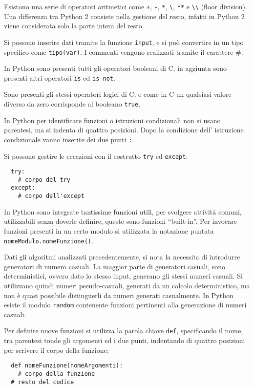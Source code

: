\documentclass{article}
\numberwithin{equation}{subsection}
\begin{document}
Esistono una serie di operatori aritmetici come \verb|+|, \verb|-|, \verb|*|, \verb|\|, \verb|**| e \verb|\\| (floor division). Una differenza tra Python 2 consiste nella gestione del resto, infatti in Python 2 
viene considerata solo la parte intera del resto. 

Si possono inserire dati tramite la funzione \verb|input|, e si può convertire in un tipo specifico come \verb|tipo(var)|. I commenti vengono 
realizzati tramite il carattere \#. 

In Python sono presenti tutti gli operatori booleani di C, in aggiunta sono presenti altri operatori \verb|is| ed \verb|is not|. 


Sono presenti gli stessi operatori logici di C, e come in C un qualsiasi valore diverso da zero corrisponde al booleano \verb|true|. 

In Python per identificare funzioni o istruzioni condizionali non si usano parentesi, ma si indenta di quattro posizioni. Dopo la condizione dell'
istruzione condizionale vanno inserite dei due punti \verb|:|. 


Si possono gestire le eccezioni con il costrutto \verb|try| ed \verb|except|:
\begin{verbatim}
  try:
    # corpo del try
  except:
    # corpo dell'except
\end{verbatim}

In Python sono integrate tantissime funzioni utili, per svolgere attività comuni, utilizzabili senza doverle definire, queste sono funzioni ``built-in''. 
Per invocare funzioni presenti in un certo modulo si utilizzata la notazione puntata \verb|nomeModulo.nomeFunzione()|. 


Dati gli algoritmi analizzati precedentemente, si nota la necessita di introdurre generatori di numero casuali. La maggior parte di generatori casuali, sono deterministici, 
ovvero dato lo stesso input, generano gli stessi numeri casuali. Si utilizzano quindi numeri pseudo-casuali, generati da un calcolo deterministico, ma non è quasi possibile 
distinguerli da numeri generati casualmente. In Python esiste il modulo \verb|random| contenente funzioni pertinenti alla generazione di numeri casuali. 

Per definire nuove funzioni si utilizza la parola chiave \verb|def|, specificando il nome, tra parentesi tonde gli argomenti ed i due punti, indentando di quattro posizioni 
per scrivere il corpo della funzione:
\begin{verbatim}
  def nomeFunzione(nomeArgomenti):
    # corpo della funzione
  # resto del codice
\end{verbatim}
\end{document}
